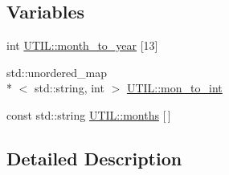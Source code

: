 \subsection*{Variables}
\begin{DoxyCompactItemize}
\item 
int \hyperlink{group__UTIL_ga825bc9e6f0accf92a1b07431568a397c}{U\-T\-I\-L\-::month\-\_\-to\-\_\-year} \mbox{[}13\mbox{]}
\item 
std\-::unordered\-\_\-map\\*
$<$ std\-::string, int $>$ \hyperlink{group__UTIL_ga044d0402087a045aabd076a5126699d2}{U\-T\-I\-L\-::mon\-\_\-to\-\_\-int}
\item 
const std\-::string \hyperlink{group__UTIL_ga88a2cb2e6ccec0c5df742e71dc28835b}{U\-T\-I\-L\-::months} \mbox{[}$\,$\mbox{]}
\end{DoxyCompactItemize}


\subsection{Detailed Description}


